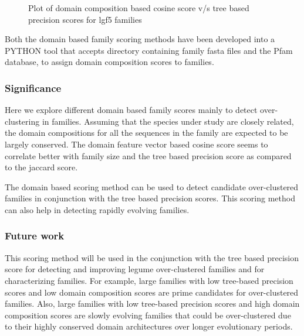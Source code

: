 \documentclass{article}
\begin{document}
		\begin{figure}
			\caption{Plot of domain composition based cosine score v/s tree based precision scores for lgf5 families}
			\label{fig:scatter_domain_cosine_vs_tree_precision_lgf5}
		\end{figure}
		
		Both the domain based family scoring methods have been developed into a PYTHON tool that accepts directory containing family fasta files and the Pfam database, to assign domain composition scores to families.
	
	\subsubsection{Significance}
	Here we explore different domain based family scores mainly to detect over-clustering in families. Assuming that the species under study are closely related, the domain compositions for all the sequences in the family are expected to be largely conserved. The domain feature vector based cosine score seems to correlate better with family size and the tree based precision score as compared to the jaccard score.
	
	The domain based scoring method can be used to detect candidate over-clustered families in conjunction with the tree based precision scores. This scoring method can also help in detecting rapidly evolving families.
	
	\subsubsection{Future work}
	This scoring method will be used in the conjunction with the tree based precision score for detecting and improving  legume over-clustered families and for characterizing families. For example,  large families with low tree-based precision scores and low domain composition scores are prime candidates for over-clustered families. Also, large families with low tree-based precision scores and high domain composition scores are slowly evolving families that could be over-clustered due to their highly conserved domain architectures over longer evolutionary periods.
	
\end{document}
